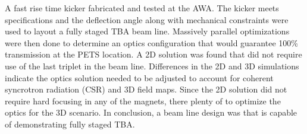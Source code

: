 A fast rise time kicker  fabricated and tested 
at the AWA. 
The kicker meets specifications and the deflection angle 
along with mechanical constraints were used to layout 
a fully staged TBA beam line. 
Massively parallel optimizations were then done to 
determine an optics configuration that would guarantee 
100\% transmission at the PETS location. 
A 2D solution was found that did not require use of the
last  triplet in the beam  line. 
Differences in the 2D and 3D simulations indicate the optics 
solution needed to be adjusted to account for coherent syncrotron radiation (CSR) and 3D field maps. 
Since the 2D solution did not require hard focusing in any of the magnets, 
there  plenty of  to optimize the optics for the 3D scenario.
In conclusion, a beam line design was  that is capable of 
demonstrating fully staged TBA. 










